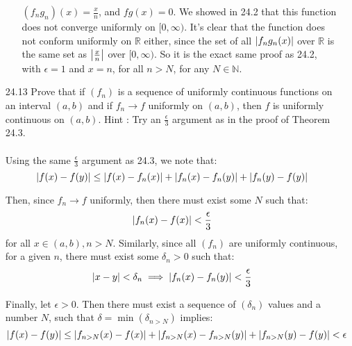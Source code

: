 \begin{enumerate}
\begin{enumerate}
        $(f_ng_n)(x) = \frac{x}{n}$, and $fg(x) = 0$. We showed in 24.2 that this function does not converge uniformly on $[0, \infty)$. It's clear that the function does not conform uniformly on $\mathds{R}$ either, since the set of all $\left\vert f_ng_n(x) \right\vert$ over $\mathds{R}$ is the same set as $\left\vert \frac{x}{n} \right\vert$ over $[0,\infty)$. So it is the exact same proof as 24.2, with $\epsilon = 1$ and $x = n$, for all $n > N$, for any $N \in \mathds{N}$.
    \end{enumerate}
  \item [24.13]
    Prove that if $(f_n)$ is a sequence of uniformly continuous functions on an interval $(a,b)$ and if $f_n \rightarrow f$ uniformly on $(a,b)$, then $f$ is uniformly continuous on $(a,b)$. Hint : Try an $\frac{\epsilon}{3}$ argument as in the proof of Theorem 24.3.\\\\

    Using the same $\frac{\epsilon}{3}$ argument as 24.3, we note that:
    $$\left\vert f(x) - f(y) \right\vert \leq \left\vert f(x) - f_n(x) \right\vert + \left\vert f_n(x) - f_n(y) \right\vert + \left\vert f_n(y) - f(y) \right\vert$$

    Then, since $f_n \rightarrow f$ uniformly, then there must exist some $N$ such that:
    $$\left\vert f_n(x) - f(x) \right\vert < \frac{\epsilon}{3}$$
    for all $x \in (a,b), n > N$. Similarly, since all $(f_n)$ are uniformly continuous, for a given $n$, there must exist some $\delta_n > 0$ such that:
    $$\left\vert x-y \right\vert < \delta_n \implies \left\vert f_n(x) - f_n(y) \right\vert < \frac{\epsilon}{3}$$

    Finally, let $\epsilon > 0$. Then there must exist a sequence of $(\delta_n)$ values and a number $N$, such that $\delta = \min{(\delta_{n>N})}$ implies:
    $$\left\vert f(x) - f(y) \right\vert \leq \left\vert f_{n>N}(x) - f(x) \right\vert + \left\vert f_{n>N}(x) - f_{n>N}(y) \right\vert + \left\vert f_{n>N}(y) - f(y) \right\vert < \epsilon$$
\end{enumerate}



